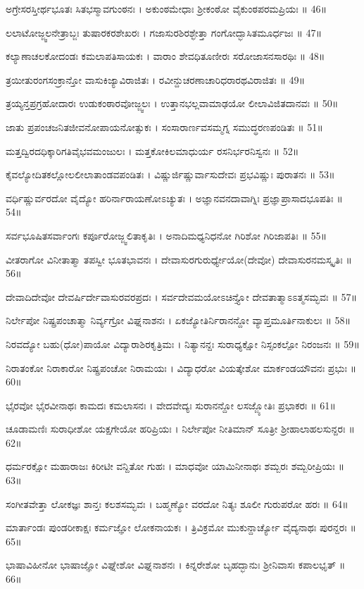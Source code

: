 ಅಗ್ರೇಸರಸ್ತೀರ್ಥಭೂತಃ ಸಿತಭಸ್ಮಾವಗುಂಠನಃ ।
ಅಕುಂಠಮೇಧಾಃ ಶ್ರೀಕಂಠೋ ವೈಕುಂಠಪರಮಪ್ರಿಯಃ ॥ 46॥

ಲಲಾಟೋಜ್ಜ್ವಲನೇತ್ರಾಬ್ಜಃ ತುಷಾರಕರಶೇಖರಃ ।
ಗಜಾಸುರಶಿರಶ್ಛೇತ್ತಾ ಗಂಗೋದ್ಭಾಸಿತಮೂರ್ಧಜಃ ॥ 47॥

ಕಲ್ಯಾಣಾಚಲಕೋದಂಡಃ ಕಮಲಾಪತಿಸಾಯಕಃ ।
ವಾರಾಂ ಶೇವಧಿತೂಣೀರಃ ಸರೋಜಾಸನಸಾರಥಿಃ ॥ 48॥

ತ್ರಯೀತುರಂಗಸಂಕ್ರಾನ್ತೋ ವಾಸುಕಿಜ್ಯಾವಿರಾಜಿತಃ ।
ರವೀನ್ದುಚರಣಾಚಾರಿಧರಾರಥವಿರಾಜಿತಃ ॥ 49॥

ತ್ರಯ್ಯನ್ತಪ್ರಗ್ರಹೋದಾರಃ ಉಡುಕಂಠಾರವೋಜ್ಜ್ವಲಃ ।
ಉತ್ತಾನಭಲ್ಲವಾಮಾಢಯೋ ಲೀಲಾವಿಜಿತದಾನವಃ ॥ 50॥

ಜಾತು ಪ್ರಪಂಚಜನಿತಜೀವನೋಪಾಯನೋತ್ಸುಕಃ ।
ಸಂಸಾರಾರ್ಣವಸಮ್ಮಗ್ನ ಸಮುದ್ಧರಣಪಂಡಿತಃ ॥ 51॥

ಮತ್ತದ್ವಿರದಧಿಕ್ಕಾರಿಗತಿವೈಭವಮಂಜುಲಃ ।
ಮತ್ತಕೋಕಿಲಮಾಧುರ್ಯ ರಸನಿರ್ಭರನಿಸ್ವನಃ ॥ 52॥

ಕೈವಲ್ಯೋದಿತಕಲ್ಲೋಲಲೀಲಾತಾಂಡವಪಂಡಿತಃ ।
ವಿಷ್ಣುರ್ಜಿಷ್ಣುರ್ವಾಸುದೇವಃ ಪ್ರಭವಿಷ್ಣುಃ ಪುರಾತನಃ ॥ 53॥

ವರ್ಧಿಷ್ಣುರ್ವರದೋ ವೈದ್ಯೋ ಹರಿರ್ನಾರಾಯಣೋಽಚ್ಯುತಃ ।
ಅಜ್ಞಾನವನದಾವಾಗ್ನಿಃ ಪ್ರಜ್ಞಾಪ್ರಾಸಾದಭೂಪತಿಃ ॥ 54॥

ಸರ್ವಭೂಷಿತಸರ್ವಾಂಗಃ ಕರ್ಪೂರೋಜ್ಜ್ವಲಿತಾಕೃತಿಃ ।
ಅನಾದಿಮಧ್ಯನಿಧನೋ ಗಿರಿಶೋ ಗಿರಿಜಾಪತಿಃ ॥ 55॥

ವೀತರಾಗೋ ವಿನೀತಾತ್ಮಾ ತಪಸ್ವೀ ಭೂತಭಾವನಃ ।
ದೇವಾಸುರಗುರುರ್ಧ್ಯೇಯೋ(ದೇವೋ) ದೇವಾಸುರನಮಸ್ಕೃತಿಃ ॥ 56॥

ದೇವಾದಿದೇವೋ ದೇವರ್ಷಿರ್ದೇವಾಸುರವರಪ್ರದಃ ।
ಸರ್ವದೇವಮಯೋಽಚಿನ್ತ್ಯೋ ದೇವತಾತ್ಮಾಽಽತ್ಮಸಮ್ಭವಃ ॥ 57॥

ನಿರ್ಲೇಪೋ ನಿಷ್ಪ್ರಪಂಚಾತ್ಮಾ ನಿರ್ವ್ಯಗ್ರೋ ವಿಘ್ನನಾಶನಃ ।
ಏಕಜ್ಯೋತಿರ್ನಿರಾನನ್ದೋ ವ್ಯಾಪ್ತಮೂರ್ತಿನಾಕುಲಃ ॥ 58॥

ನಿರವದ್ಯೋ ಬಹು(ಧೋ)ಪಾಯೋ ವಿದ್ಯಾರಾಶಿರಕೃತ್ರಿಮಃ ।
ನಿತ್ಯಾನನ್ದಃ ಸುರಾಧ್ಯಕ್ಷೋ ನಿಸ್ಸಂಕಲ್ಪೋ ನಿರಂಜನಃ ॥ 59॥

ನಿರಾತಂಕೋ ನಿರಾಕಾರೋ ನಿಷ್ಪ್ರಪಂಚೋ ನಿರಾಮಯಃ ।
ವಿದ್ಯಾಧರೋ ವಿಯತ್ಕೇಶೋ ಮಾರ್ಕಂಡಯೌವನಃ ಪ್ರಭುಃ ॥ 60॥

ಭೈರವೋ ಭೈರವೀನಾಥಃ ಕಾಮದಃ ಕಮಲಾಸನಃ ।
ವೇದವೇದ್ಯಃ ಸುರಾನನ್ದೋ ಲಸಜ್ಜ್ಯೋತಿಃ ಪ್ರಭಾಕರಃ ॥ 61॥

ಚೂಡಾಮಣಿಃ ಸುರಾಧೀಶೋ ಯಕ್ಷಗೇಯೋ ಹರಿಪ್ರಿಯಃ ।
ನಿರ್ಲೇಪೋ ನೀತಿಮಾನ್ ಸೂತ್ರೀ ಶ್ರೀಹಾಲಾಹಲಸುನ್ದರಃ ॥ 62॥

ಧರ್ಮರಕ್ಷೋ ಮಹಾರಾಜಃ ಕಿರೀಟೀ ವನ್ದಿತೋ ಗುಹಃ ।
ಮಾಧವೋ ಯಾಮಿನೀನಾಥಃ ಶಮ್ಬರಃ ಶಮ್ಬರೀಪ್ರಿಯಃ ॥ 63॥

ಸಂಗೀತವೇತ್ತಾ ಲೋಕಜ್ಞಃ ಶಾನ್ತಃ ಕಲಶಸಮ್ಭವಃ ।
ಬಹ್ಮಣ್ಯೋ ವರದೋ ನಿತ್ಯಃ ಶೂಲೀ ಗುರುಪರೋ ಹರಃ ॥ 64॥

ಮಾರ್ತಾಂಡಃ ಪುಂಡರೀಕಾಕ್ಷಃ ಕರ್ಮಜ್ಞೋ ಲೋಕನಾಯಕಃ ।
ತ್ರಿವಿಕ್ರಮೋ ಮುಕುನ್ದಾರ್ಚ್ಯೋ ವೈದ್ಯನಾಥಃ ಪುರನ್ದರಃ ॥ 65॥

ಭಾಷಾವಿಹೀನೋ ಭಾಷಾಜ್ಞೋ ವಿಘ್ನೇಶೋ ವಿಘ್ನನಾಶನಃ ।
ಕಿನ್ನರೇಶೋ ಬೃಹದ್ಭಾನುಃ ಶ್ರೀನಿವಾಸಃ ಕಪಾಲಭೃತ್ ॥ 66॥

